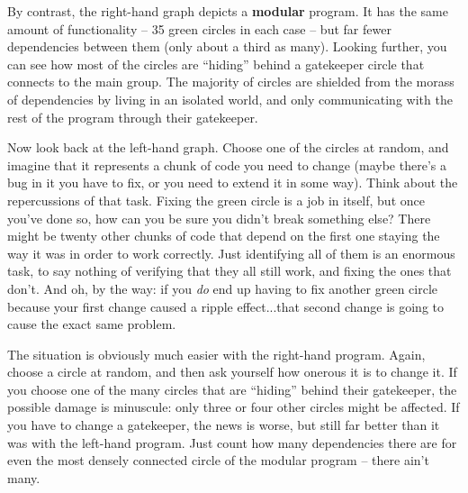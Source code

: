 By contrast, the right-hand graph depicts a \textbf{modular} program. It has
the same amount of functionality -- 35 green circles in each case -- but far
fewer dependencies between them (only about a third as many). Looking further,
you can see how most of the circles are ``hiding'' behind a gatekeeper circle
that connects to the main group. The majority of circles are shielded from the
morass of dependencies by living in an isolated world, and only communicating
with the rest of the program through their gatekeeper.

Now look back at the left-hand graph. Choose one of the circles at random, and
imagine that it represents a chunk of code you need to change (maybe there's a
bug in it you have to fix, or you need to extend it in some way). Think about
the repercussions of that task. Fixing the green circle is a job in itself,
but once you've done so, how can you be sure you didn't break something else?
There might be twenty other chunks of code that depend on the first one
staying the way it was in order to work correctly. Just identifying all of
them is an enormous task, to say nothing of verifying that they all still
work, and fixing the ones that don't. And oh, by the way: if you \textit{do}
end up having to fix another green circle because your first change caused a
ripple effect...that second change is going to cause the exact same problem.

The situation is obviously much easier with the right-hand program. Again,
choose a circle at random, and then ask yourself how onerous it is to change
it. If you choose one of the many circles that are ``hiding'' behind their
gatekeeper, the possible damage is minuscule: only three or four other circles
might be affected. If you have to change a gatekeeper, the news is worse, but
still far better than it was with the left-hand program. Just count how many
dependencies there are for even the most densely connected circle of the
modular program -- there ain't many.

